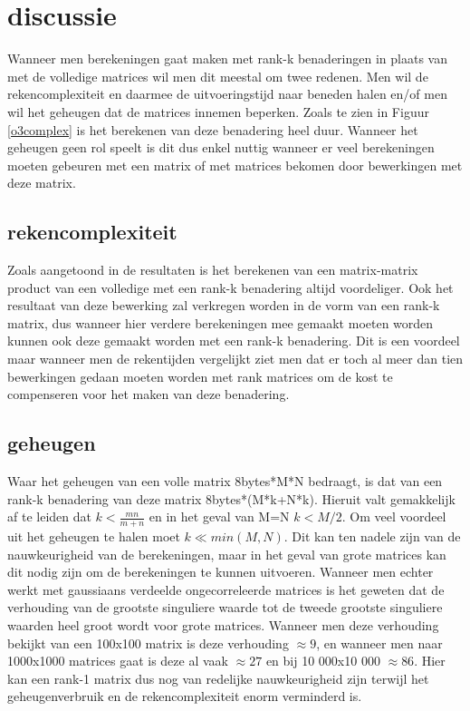 \documentclass[a4paper]{article}
\begin{document}
\section*{discussie}

Wanneer men berekeningen gaat maken met rank-k benaderingen in plaats van met de volledige matrices wil men dit meestal om twee redenen. Men wil de rekencomplexiteit en daarmee de uitvoeringstijd naar beneden halen en/of men wil het geheugen dat de matrices innemen beperken. Zoals te zien in Figuur \ref{o3complex} is het berekenen van deze benadering heel duur. Wanneer het geheugen geen rol speelt is dit dus enkel nuttig wanneer er veel berekeningen moeten gebeuren met een matrix of met matrices bekomen door bewerkingen met deze matrix. 

\subsection*{rekencomplexiteit}

Zoals aangetoond in de resultaten is het berekenen van een matrix-matrix product van een volledige met een rank-k benadering altijd voordeliger. Ook het resultaat van deze bewerking zal verkregen worden in de vorm van een rank-k matrix, dus wanneer hier verdere berekeningen mee gemaakt moeten worden kunnen ook deze gemaakt worden met een rank-k benadering. Dit is een voordeel maar wanneer men de rekentijden vergelijkt ziet men dat er toch al meer dan tien bewerkingen gedaan moeten worden met rank matrices om de kost te compenseren voor het maken van deze benadering.

\subsection*{geheugen}
Waar het geheugen van een volle matrix 8bytes*M*N bedraagt, is dat van een rank-k benadering van deze matrix 8bytes*(M*k+N*k). Hieruit valt gemakkelijk af te leiden dat $k<\frac{mn}{m+n}$ en in het geval van M=N $k<M/2$. Om veel voordeel uit het geheugen te halen moet $k\ll min(M,N)$. Dit kan ten nadele zijn van de nauwkeurigheid van de berekeningen, maar in het geval van grote matrices kan dit nodig zijn om de berekeningen te kunnen uitvoeren. Wanneer men echter werkt met gaussiaans verdeelde ongecorreleerde matrices is het geweten dat de verhouding van de grootste singuliere waarde tot de tweede grootste singuliere waarden heel groot wordt voor grote matrices. Wanneer men deze verhouding bekijkt van een 100x100 matrix is deze verhouding $\approx 9$, en wanneer men naar 1000x1000 matrices gaat is deze al vaak $\approx 27$ en bij 10 000x10 000 $\approx 86$. Hier kan een rank-1 matrix dus nog van redelijke nauwkeurigheid zijn terwijl het geheugenverbruik en de rekencomplexiteit enorm verminderd is.
\end{document}
